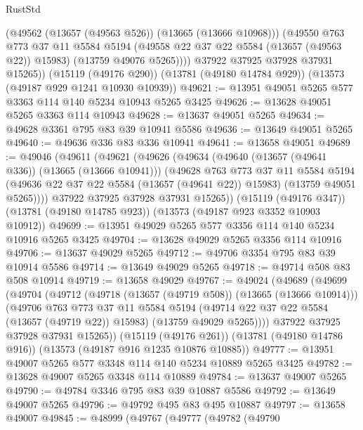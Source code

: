 \begin{lexlean}{RustStd}
\begin{coremodule}
            (@49562 (@13657 (@49563 @526)) (@13665 (@13666 @10968)))
            (@49550
              @763
              @773
              @37
              @11
              @5584
              @5194
              (@49558 @22 @37 @22 @5584 (@13657 (@49563 @22)) @15983)
              (@13759 @49076 @5265))))
        @37922
        @37925
        @37928
        @37931
        @15265))
    (@15119 (@49176 @290))
    (@13781 (@49180 @14784 @929))
    (@13573 (@49187 @929 @1241 @10930 @10939))
@49621 := @13951 @49051 @5265 @577 @3363 @114 @140 @5234 @10943 @5265 @3425
@49626 := @13628 @49051 @5265 @3363 @114 @10943
@49628 := @13637 @49051 @5265
@49634 := @49628 @3361 @795 @83 @39 @10941 @5586
@49636 := @13649 @49051 @5265
@49640 := @49636 @336 @83 @336 @10941
@49641 := @13658 @49051
@49689 := @49046
    (@49611
      (@49621
        (@49626
          (@49634
            (@49640 (@13657 (@49641 @336)) (@13665 (@13666 @10941)))
            (@49628
              @763
              @773
              @37
              @11
              @5584
              @5194
              (@49636 @22 @37 @22 @5584 (@13657 (@49641 @22)) @15983)
              (@13759 @49051 @5265))))
        @37922
        @37925
        @37928
        @37931
        @15265))
    (@15119 (@49176 @347))
    (@13781 (@49180 @14785 @923))
    (@13573 (@49187 @923 @3352 @10903 @10912))
@49699 := @13951 @49029 @5265 @577 @3356 @114 @140 @5234 @10916 @5265 @3425
@49704 := @13628 @49029 @5265 @3356 @114 @10916
@49706 := @13637 @49029 @5265
@49712 := @49706 @3354 @795 @83 @39 @10914 @5586
@49714 := @13649 @49029 @5265
@49718 := @49714 @508 @83 @508 @10914
@49719 := @13658 @49029
@49767 := @49024
    (@49689
      (@49699
        (@49704
          (@49712
            (@49718 (@13657 (@49719 @508)) (@13665 (@13666 @10914)))
            (@49706
              @763
              @773
              @37
              @11
              @5584
              @5194
              (@49714 @22 @37 @22 @5584 (@13657 (@49719 @22)) @15983)
              (@13759 @49029 @5265))))
        @37922
        @37925
        @37928
        @37931
        @15265))
    (@15119 (@49176 @261))
    (@13781 (@49180 @14786 @916))
    (@13573 (@49187 @916 @1235 @10876 @10885))
@49777 := @13951 @49007 @5265 @577 @3348 @114 @140 @5234 @10889 @5265 @3425
@49782 := @13628 @49007 @5265 @3348 @114 @10889
@49784 := @13637 @49007 @5265
@49790 := @49784 @3346 @795 @83 @39 @10887 @5586
@49792 := @13649 @49007 @5265
@49796 := @49792 @495 @83 @495 @10887
@49797 := @13658 @49007
@49845 := @48999
    (@49767
      (@49777
        (@49782
          (@49790

\end{coremodule}
\end{lexlean}
